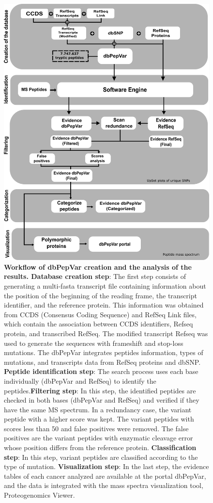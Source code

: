 \documentclass{ieeeaccess}
\begin{document}
\begin{figure}[htpb]%
\centering
\includegraphics[width=0.8\linewidth]{fig1.png}
\caption{ 
\textbf{Workflow of dbPepVar creation and the analysis of the results. Database creation step}: The first step consists of generating a multi-fasta transcript file containing information about the position of the beginning of the reading frame, the transcript identifier, and the reference protein. This information was obtained from CCDS (Consensus Coding Sequence) and RefSeq Link files, which contain the association between CCDS identifiers, Refseq protein, and transcribed RefSeq. The modified transcript Refseq was used to generate the sequences with frameshift and stop-loss mutations. The dbPepVar integrates peptides information, types of mutations, and transcripts data from RefSeq proteins and dbSNP. \textbf{Peptide identification step}: The search process uses each base individually (dbPepVar and RefSeq) to identify the peptides.\textbf{Filtering step}: In this step, the identified peptides are checked in both bases (dbPepVar and RefSeq) and verified if they have the same MS spectrum. In a redundancy case, the variant peptide with a higher score was kept. The variant peptides with scores less than 50 and false positives were removed. The false positives are the variant peptides with enzymatic cleavage error whose position differs from the reference protein. \textbf{Classification step}: In this step, variant peptides are classified according to the type of mutation. \textbf{Visualization step}: In the last step, the evidence tables of each cancer analyzed are available at the portal dbPepVar, and the data is integrated with the mass spectra visualization tool, Proteogenomics Viewer.\label{fig1}}
\end{figure}
\end{document}
